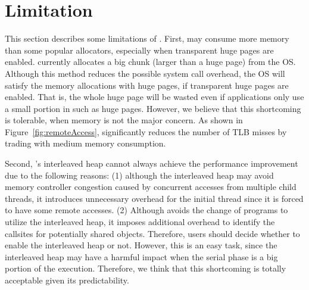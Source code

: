 \section{Limitation}
\label{sec:limit}

This section describes some limitations of \NM{}. First, \NM{} may consume more memory than some popular allocators, especially when transparent huge pages are enabled. \NM{} currently allocates a big chunk (larger than a huge page) from the OS. Although this method reduces the possible system call overhead, the OS will satisfy the memory allocations with huge pages, if transparent huge pages are enabled. That is, the whole huge page will be wasted even if applications only use a small portion in such as huge pages. However, we believe that this shortcoming is tolerable, when memory is not the major concern. As shown in Figure~\ref{fig:remoteAccess}, \NM{} significantly reduces the number of TLB misses by trading with medium memory consumption. 


Second, \NM{}'s interleaved heap cannot always achieve the performance improvement due to the following reasons: (1) although the interleaved heap may avoid memory controller congestion caused by concurrent accesses from multiple child threads, it introduces unnecessary overhead for the initial thread since it is forced to have some remote accesses. (2) Although \NM{} avoids the change of programs to utilize the interleaved heap, it imposes additional overhead to identify the callsites for potentially shared objects. Therefore, users should decide whether to enable the interleaved heap or not. However, this is an easy task, since the interleaved heap may have a harmful impact when the serial phase is a big portion of the execution. Therefore, we think that this shortcoming is totally acceptable given its predictability. 

